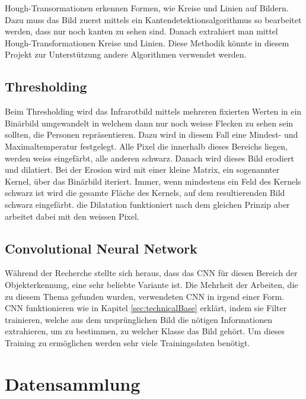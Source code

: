 Hough-Transormationen erkennen Formen, wie Kreise und Linien auf Bildern. Dazu muss das Bild zuerst mittels ein Kantendetektionsalgorithmus so bearbeitet werden, dass nur noch kanten zu sehen sind. Danach extrahiert man mittel Hough-Transformationen Kreise und Linien. Diese Methodik könnte in diesem Projekt zur Unterstützung andere Algorithmen verwendet werden.


\subsection{Thresholding}

Beim Thresholding wird das Infrarotbild mittels mehreren fixierten Werten in ein Binärbild umgewandelt in welchem dann nur noch weisse Flecken zu sehen sein sollten, die Personen repräsentieren. Dazu wird in diesem Fall eine Mindest- und Maximaltemperatur festgelegt. Alle Pixel die innerhalb dieses Bereichs liegen, werden weiss eingefärbt, alle anderen schwarz. Danach wird dieses Bild erodiert und dilatiert. Bei der Erosion wird mit einer kleine Matrix, ein sogenannter Kernel, über das Binärbild iteriert. Immer, wenn mindestens ein Feld des Kernels schwarz ist wird die gesamte Fläche des Kernels, auf dem resultierenden Bild schwarz eingefärbt. die Dilatation funktioniert nach dem gleichen Prinzip aber arbeitet dabei mit den weissen Pixel.

\subsection{Convolutional Neural Network}

Während der Recherche stellte sich heraus, dass das \gls{CNN} für diesen Bereich der Objekterkennung, eine sehr beliebte Variante ist. Die Mehrheit der Arbeiten, die zu diesem Thema gefunden wurden, verwendeten \gls{CNN} in irgend einer Form.\\
\gls{CNN} funktionieren wie in Kapitel \ref{sec:technicalBase} erklärt, indem sie Filter trainieren, welche aus dem ursprünglichen Bild die nötigen Informationen extrahieren, um zu bestimmen, zu welcher Klasse das Bild gehört. Um dieses Training zu ermöglichen werden sehr viele Trainingsdaten benötigt.

\section{Datensammlung}

